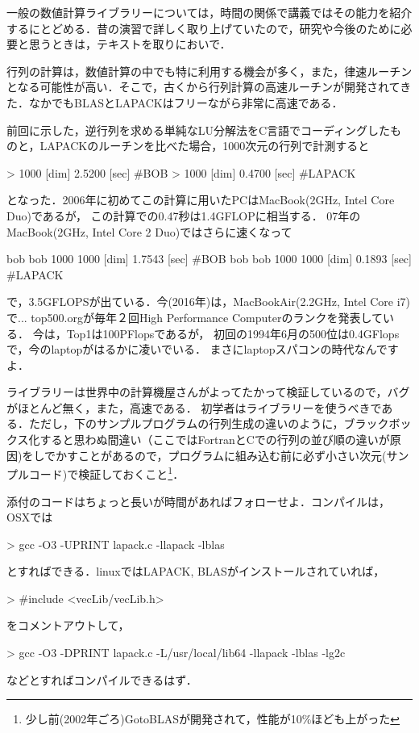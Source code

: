 一般の数値計算ライブラリーについては，時間の関係で講義ではその能力を紹介するにとどめる．昔の演習で詳しく取り上げていたので，研究や今後のために必要と思うときは，テキストを取りにおいで．

行列の計算は，数値計算の中でも特に利用する機会が多く，また，律速ルーチンとなる可能性が高い．そこで，古くから行列計算の高速ルーチンが開発されてきた．なかでもBLASとLAPACKはフリーながら非常に高速である． 

前回に示した，逆行列を求める単純なLU分解法をC言語でコーディングしたものと，LAPACKのルーチンを比べた場合，1000次元の行列で計測すると
\begin{MapleInput}
>  1000 [dim]     2.5200 [sec] #BOB
>  1000 [dim]     0.4700 [sec] #LAPACK
\end{MapleInput}
となった．2006年に初めてこの計算に用いたPCはMacBook(2GHz, Intel Core Duo)であるが，
この計算での0.47秒は1.4GFLOPに相当する．
07年のMacBook(2GHz, Intel Core 2 Duo)ではさらに速くなって
\begin{MapleInput}
bob%
bob%
1000
 1000 [dim]     1.7543 [sec] #BOB
bob%
bob%
1000
 1000 [dim]     0.1893 [sec] #LAPACK
\end{MapleInput}
で，3.5GFLOPSが出ている．今(2016年)は，MacBookAir(2.2GHz, Intel Core i7)で...
top500.orgが毎年２回High Performance Computerのランクを発表している．
今は，Top1は100PFlopsであるが，
初回の1994年6月の500位は0.4GFlopsで，今のlaptopがはるかに凌いでいる．
まさにlaptopスパコンの時代なんですよ．

ライブラリーは世界中の計算機屋さんがよってたかって検証しているので，バグがほとんど無く，また，高速である．
初学者はライブラリーを使うべきである．ただし，下のサンプルプログラムの行列生成の違いのように，ブラックボックス化すると思わぬ間違い（ここではFortranとCでの行列の並び順の違いが原因)をしでかすことがあるので，プログラムに組み込む前に必ず小さい次元(サンプルコード)で検証しておくこと\footnote{少し前(2002年ごろ)GotoBLASが開発されて，性能が10\%ほども上がった}．

添付のコードはちょっと長いが時間があればフォローせよ．コンパイルは，OSXでは
\begin{MapleInput}
> gcc -O3 -UPRINT lapack.c -llapack -lblas
\end{MapleInput}
とすればできる．linuxではLAPACK, BLASがインストールされていれば，
\begin{MapleInput}
> #include <vecLib/vecLib.h>
\end{MapleInput}
をコメントアウトして，
\begin{MapleInput}
> gcc -O3 -DPRINT lapack.c -L/usr/local/lib64 -llapack -lblas -lg2c
\end{MapleInput}
などとすればコンパイルできるはず．

